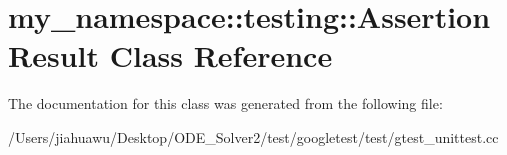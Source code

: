 \hypertarget{classmy__namespace_1_1testing_1_1_assertion_result}{}\section{my\+\_\+namespace\+:\+:testing\+:\+:Assertion\+Result Class Reference}
\label{classmy__namespace_1_1testing_1_1_assertion_result}


The documentation for this class was generated from the following file\+:\begin{DoxyCompactItemize}
\item 
/\+Users/jiahuawu/\+Desktop/\+O\+D\+E\+\_\+\+Solver2/test/googletest/test/gtest\+\_\+unittest.\+cc\end{DoxyCompactItemize}
